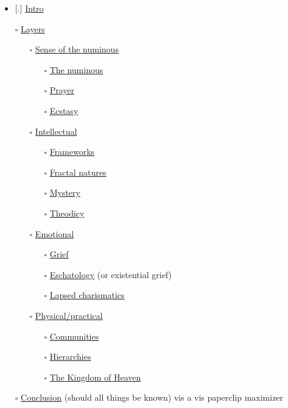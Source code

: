 \begin{itemize}
\tightlist
\item
  {[}.{]} \href{intro}{Intro}
\item[$\square$]
  \href{layers}{Layers}

  \begin{itemize}
  \tightlist
  \item[$\square$]
    \href{section-numinous}{Sense of the numinous}

    \begin{itemize}
    \tightlist
    \item[$\square$]
      \href{numinous}{The numinous}
    \item[$\square$]
      \href{prayer}{Prayer}
    \item[$\square$]
      \href{ecstasy}{Ecstasy}
    \end{itemize}
  \item[$\square$]
    \href{section-intellectual}{Intellectual}

    \begin{itemize}
    \tightlist
    \item[$\square$]
      \href{frameworks}{Frameworks}
    \item[$\square$]
      \href{fractal}{Fractal natures}
    \item[$\square$]
      \href{mystery}{Mystery}
    \item[$\square$]
      \href{theodicy}{Theodicy}
    \end{itemize}
  \item[$\square$]
    \href{section-emotional}{Emotional}

    \begin{itemize}
    \tightlist
    \item[$\square$]
      \href{grief}{Grief}
    \item[$\square$]
      \href{eschatology}{Eschatology} (or existential grief)
    \item[$\square$]
      \href{charismatics}{Lapsed charismatics}
    \end{itemize}
  \item[$\square$]
    \href{section-practical}{Physical/practical}

    \begin{itemize}
    \tightlist
    \item[$\square$]
      \href{communities}{Communities}
    \item[$\square$]
      \href{hierarchies}{Hierarchies}
    \item[$\square$]
      \href{kingdom}{The Kingdom of Heaven}
    \end{itemize}
  \end{itemize}
\item[$\square$]
  \href{conclusion}{Conclusion} (should all things be known) vis a vis paperclip maximizer
\end{itemize}

